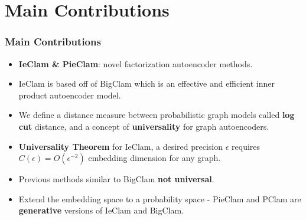 \documentclass{beamer}
\begin{document}
\section{Main Contributions}

\begin{frame}
\frametitle{Main Contributions}







\begin{itemize}[itemsep=1em, label=\textbullet]
    \item \textbf{IeClam \& PieClam}: novel factorization autoencoder methods.
    \item IeClam is based off of BigClam which is an effective and efficient inner product autoencoder model.
    \item We define a distance measure between probabilistic graph models called \textbf{log cut} distance, and a concept of \textbf{universality} for graph autoencoders.
    \item \textbf{Universality Theorem} for IeClam, a desired precision $\epsilon$ requires $C(\epsilon)= O(\epsilon^{-2})$ embedding dimension for any graph.%
    \item Previous methods similar to BigClam \textbf{not universal}. %
    \item Extend the embedding space to a probability space - PieClam and PClam are \textbf{generative} versions of IeClam and BigClam.%
    
\end{itemize}
\end{frame}
\end{document}

